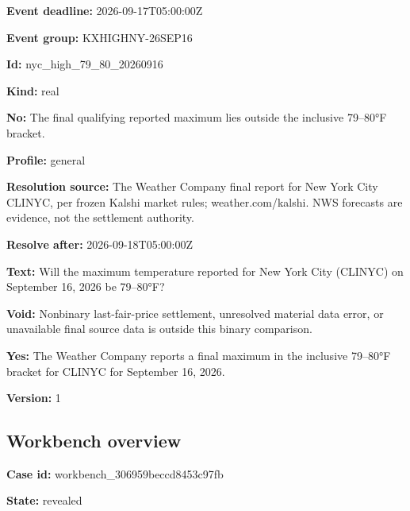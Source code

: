 \documentclass[11pt]{article}
\begin{document}
\par\noindent\textbf{Event deadline:} 2026-09-17T05:00:00Z

\par\noindent\textbf{Event group:} KXHIGHNY-26SEP16

\par\noindent\textbf{Id:} nyc\_high\_79\_80\_20260916

\par\noindent\textbf{Kind:} real

\par\noindent\textbf{No:} The final qualifying reported maximum lies outside the inclusive 79–80°F bracket.

\par\noindent\textbf{Profile:} general

\par\noindent\textbf{Resolution source:} The Weather Company final report for New York City CLINYC, per frozen Kalshi market rules; weather.com/kalshi. NWS forecasts are evidence, not the settlement authority.

\par\noindent\textbf{Resolve after:} 2026-09-18T05:00:00Z

\par\noindent\textbf{Text:} Will the maximum temperature reported for New York City (CLINYC) on September 16, 2026 be 79–80°F?

\par\noindent\textbf{Void:} Nonbinary last-fair-price settlement, unresolved material data error, or unavailable final source data is outside this binary comparison.

\par\noindent\textbf{Yes:} The Weather Company reports a final maximum in the inclusive 79–80°F bracket for CLINYC for September 16, 2026.

\par\noindent\textbf{Version:} 1

\subsection*{\textcolor{epdarkgreen}{Workbench overview}}
\par\noindent\textbf{Case id:} workbench\_30\hspace{0pt}6959beccd845\hspace{0pt}3c97fb

\par\noindent\textbf{State:} revealed
\end{document}
